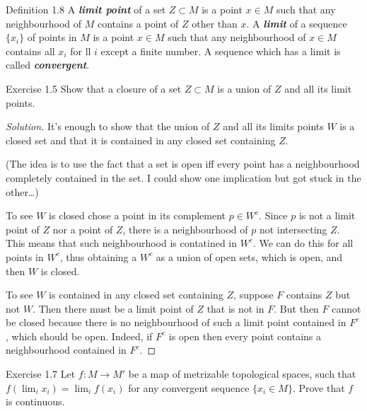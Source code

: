 \begin{thing3}{Definition 1.8}\leavevmode
	A \textit{\textbf{limit point}} of a set  $Z \subset M$ is a point $x \in M$ such that any neighbourhood of $M$ contains a point of $Z$ other than $x$. A \textit{\textbf{limit}} of a sequence $\{ x_i\}$ of points in $M$ is a point $x \in M$ such that any neighbourhood of  $x \in M$ contains all $x_i$ for ll $i$ except a finite number. A sequence which has a limit is called \textit{\textbf{convergent}}.
\end{thing3}

\begin{thing4}{Exercise 1.5}\label{exer:1.5}\leavevmode
	Show that a closure of a set $Z \subset M$ is a union of $Z$ and all its limit points.
\end{thing4}

\begin{proof}[Solution]\leavevmode
	It's enough to show that the union of $Z$ and all its limits points $W$ is a closed set and that it is contained in any closed set containing $Z$.

	(The idea is to use the fact that a set is open iff every point has a neighbourhood completely contained in the set. I could show one implication but got stuck in the other…)

	To see $W$ is closed chose a point in its complement $p \in W^c$. Since $p$ is not a limit point of $Z$ nor a point of $Z$, there is a neighbourhood of $p$ not intersecting $Z$. This means that such neighbourhood is contatined in $W^c$. We can do this for all points in $W^c$, thus obtaining a $W^c$ as a union of open sets, which is open, and then $W$ is closed.

	To see $W$ is contained in any closed set containing $Z$, suppose $F$ contains $Z$ but not $W$. Then there must be a limit point of $Z$ that is not in $F$. But then $F$ cannot be closed because there is no neighbourhood of such a limit point contained in $F^c$, which should be open. {\color{2}Indeed, if $F^c$ is open then every point contains a neighbourhood contained in $F^c$.}
\end{proof}

\begin{thing4}{Exercise 1.7}\label{exer:1.7}\leavevmode
Let $f:M\to M'$ be a map of metrizable topological spaces, such that $f \left( \lim_{i} x_i \right) =\lim_{i} f(x_i)$ for any convergent sequence $\{x_i \in M\}$. Prove that $f$ is continuous.	
\end{thing4}

